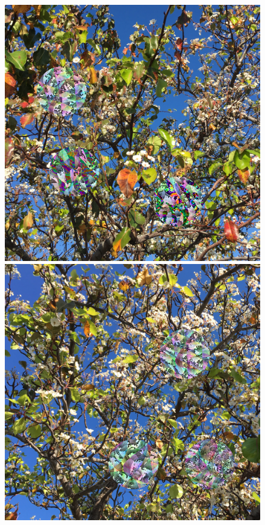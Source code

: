 \documentclass[acmtog]{acmart}
\begin{document}
\begin{figure}
    \includegraphics[scale=0.24]{20221108_2018_step_4655.png}
    \hfill
    \includegraphics[scale=0.24]{20221108_2018_step_5498.png}

\end{figure}
\end{document}
